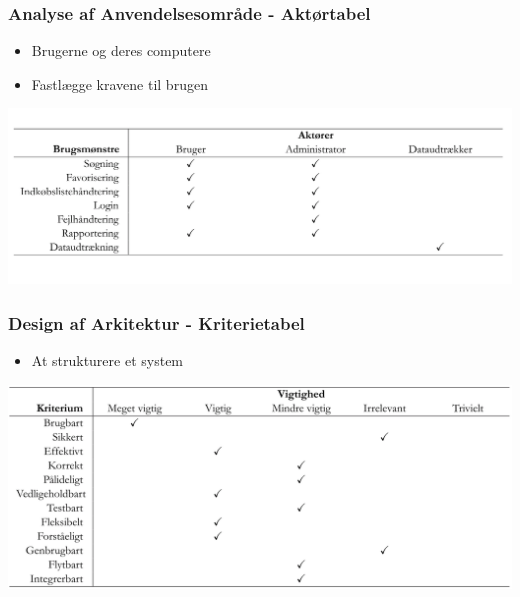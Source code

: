 	\begin{frame}
		\frametitle{Analyse af Anvendelsesområde - Aktørtabel}
		\begin{itemize}
			\item Brugerne og deres computere
			\item Fastlægge kravene til brugen 
		\end{itemize}
		\begin{center}
    		\includegraphics[scale=0.35]{billeder/aktoertabel.png}
		\end{center}
	\end{frame}
	
	\begin{frame}
		\frametitle{Design af Arkitektur - Kriterietabel}
		\begin{itemize}
			\item At strukturere et system
		\end{itemize}
		\begin{center}
    		\includegraphics[scale=0.3]{billeder/kriterietabel.png}
		\end{center}
	\end{frame}